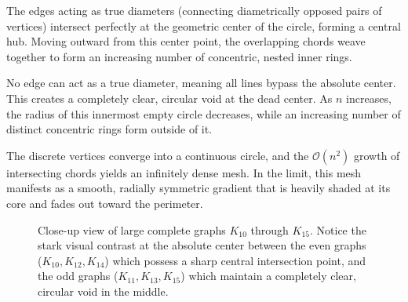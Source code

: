 \documentclass[
  12pt,
  letterpaper,
]{article}
\newcommand{\N}{\mathbb{N}}
\theoremstyle{plain}
\theoremstyle{definition}
\begin{document}
\begin{description}[leftmargin=1.8cm, labelwidth=1.6cm, align=left]
    \item[For even $n$:] The edges acting as true diameters (connecting diametrically opposed pairs of vertices) intersect perfectly at the geometric center of the circle, forming a central hub. Moving outward from this center point, the overlapping chords weave together to form an increasing number of concentric, nested inner rings.
    \item[For odd $n$:] No edge can act as a true diameter, meaning all lines bypass the absolute center. This creates a completely clear, circular void at the dead center. As $n$ increases, the radius of this innermost empty circle decreases, while an increasing number of distinct concentric rings form outside of it.
    \item[As $n \rightarrow \infty$:] The discrete vertices converge into a continuous circle, and the $\mathcal{O}(n^2)$ growth of intersecting chords yields an infinitely dense mesh. In the limit, this mesh manifests as a smooth, radially symmetric gradient that is heavily shaded at its core and fades out toward the perimeter.
\end{description}

\begin{figure}[H]
\centering
{}
\caption{Close-up view of large complete graphs $K_{10}$ through $K_{15}$. Notice the stark visual contrast at the absolute center between the even graphs ($K_{10}, K_{12}, K_{14}$) which possess a sharp central intersection point, and the odd graphs ($K_{11}, K_{13}, K_{15}$) which maintain a completely clear, circular void in the middle.}
\label{fig:large_complete_graphs}
\end{figure}
\end{document}
